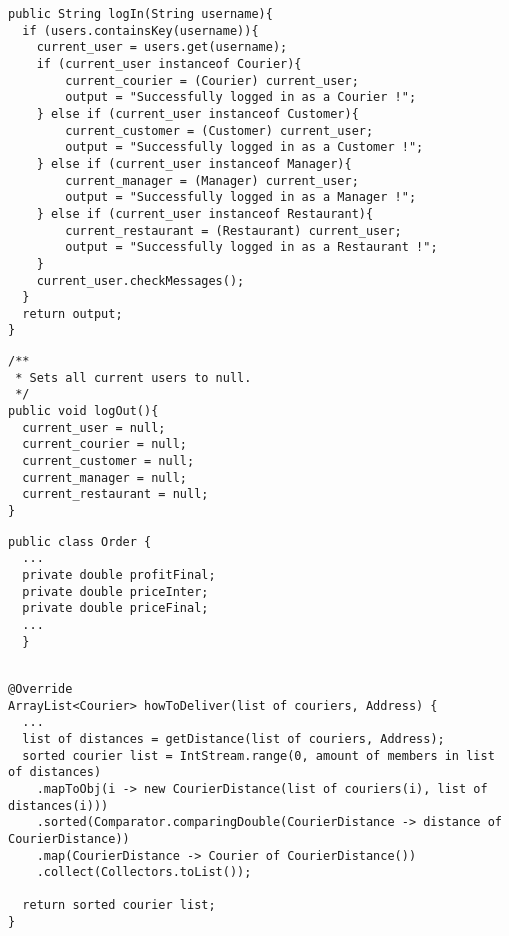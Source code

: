 \begin{lstlisting}[caption=the main methods for the log in log out system.,
  label=lst:login]
public String logIn(String username){
  if (users.containsKey(username)){
    current_user = users.get(username);
    if (current_user instanceof Courier){
    	current_courier = (Courier) current_user;
    	output = "Successfully logged in as a Courier !";
    } else if (current_user instanceof Customer){
    	current_customer = (Customer) current_user;
    	output = "Successfully logged in as a Customer !";
    } else if (current_user instanceof Manager){
    	current_manager = (Manager) current_user;
    	output = "Successfully logged in as a Manager !";
    } else if (current_user instanceof Restaurant){
    	current_restaurant = (Restaurant) current_user;
    	output = "Successfully logged in as a Restaurant !";
    }
    current_user.checkMessages(); 
  }
  return output;
}
\end{lstlisting}

\begin{lstlisting}[caption=the main methods for the log in log out system.,
  label=lst:logout]
/** 
 * Sets all current users to null.
 */
public void logOut(){
  current_user = null;
  current_courier = null;
  current_customer = null;
  current_manager = null;
  current_restaurant = null;
}
\end{lstlisting}



\begin{lstlisting}[caption=Implementation of different price quantities in \texttt{Order}.,
  label=lst:prices_order]
public class Order {
  ...
  private double profitFinal;
  private double priceInter;
  private double priceFinal;
  ...
  }
\end{lstlisting}

 \begin{lstlisting}[caption=Pseudo java code of  fastest delivery method.,
   label=lst:fast_deliv_meth] 

@Override
ArrayList<Courier> howToDeliver(list of couriers, Address) {
  ...
  list of distances = getDistance(list of couriers, Address);	
  sorted courier list = IntStream.range(0, amount of members in list of distances)
    .mapToObj(i -> new CourierDistance(list of couriers(i), list of distances(i)))
    .sorted(Comparator.comparingDouble(CourierDistance -> distance of CourierDistance))
    .map(CourierDistance -> Courier of CourierDistance())
    .collect(Collectors.toList());
  		
  return sorted courier list;
}
  
\end{lstlisting}

